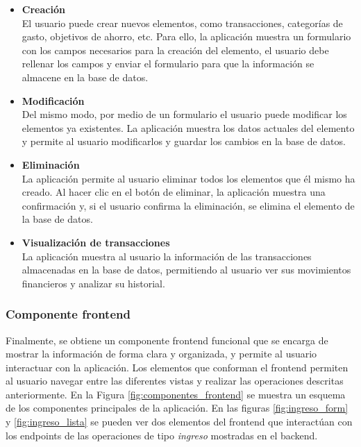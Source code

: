 \begin{itemize}
    \item \textbf{Creación}\\
        El usuario puede crear nuevos elementos, como transacciones, categorías de gasto, objetivos de ahorro, etc. Para ello, la aplicación muestra un formulario con los campos necesarios para la creación del elemento, el usuario debe rellenar los campos y enviar el formulario para que la información se almacene en la base de datos.        
    \item \textbf{Modificación}\\
        Del mismo modo, por medio de un formulario el usuario puede modificar los elementos ya existentes. La aplicación muestra los datos actuales del elemento y permite al usuario modificarlos y guardar los cambios en la base de datos.
    \item \textbf{Eliminación}\\
        La aplicación permite al usuario eliminar todos los elementos que él mismo ha creado. Al hacer clic en el botón de eliminar, la aplicación muestra una confirmación y, si el usuario confirma la eliminación, se elimina el elemento de la base de datos.
    \item \textbf{Visualización de transacciones}\\
        La aplicación muestra al usuario la información de las transacciones almacenadas en la base de datos, permitiendo al usuario ver sus movimientos financieros y analizar su historial.        
\end{itemize}

\subsubsection{Componente frontend}
Finalmente, se obtiene un componente frontend funcional que se encarga de mostrar la información de forma clara y organizada, y permite al usuario interactuar con la aplicación. Los elementos que conforman el frontend permiten al usuario navegar entre las diferentes vistas y realizar las operaciones descritas anteriormente. En la Figura \ref{fig:componentes_frontend} se muestra un esquema de los componentes principales de la aplicación. En las figuras \ref{fig:ingreso_form} y \ref{fig:ingreso_lista} se pueden ver dos elementos del frontend que interactúan con los endpoints de las operaciones de tipo \textit{ingreso} mostradas en el backend.

